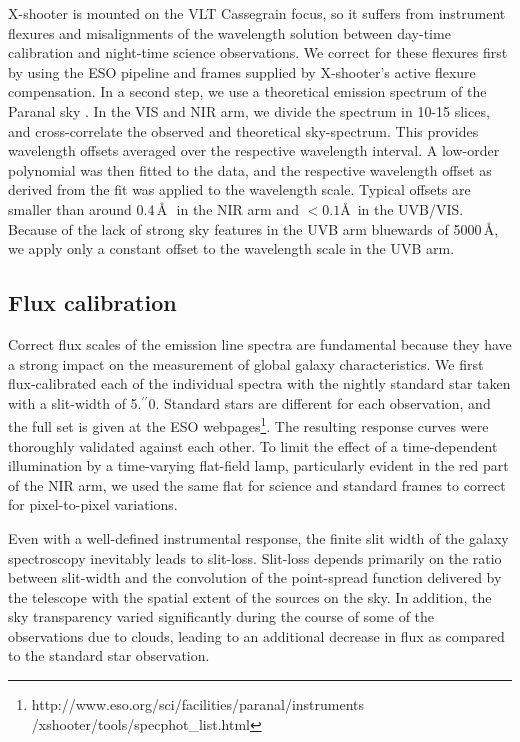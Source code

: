 \documentclass[traditabstract, longauth]{aa}
\newcommand{\farc}{\hbox{$.\!\!^{\prime\prime}$}}
\begin{document}
X-shooter is mounted on the VLT Cassegrain focus, so it suffers from instrument flexures and misalignments of the wavelength solution between day-time calibration and night-time science observations. We correct for these flexures first by using the ESO pipeline and frames supplied by X-shooter's active flexure compensation. In a second step, we use a theoretical emission spectrum of the Paranal sky \citep{2012A&A...543A..92N}. In the VIS and NIR arm, we divide the spectrum in 10-15 slices, and cross-correlate the observed and theoretical sky-spectrum. This provides wavelength offsets averaged over the respective wavelength interval. A low-order polynomial was then fitted to the data, and the respective wavelength offset as derived from the fit was applied to the wavelength scale. Typical offsets are smaller than around 0.4\,\AA\,\ in the NIR arm and $<0.1$\AA\, in the UVB/VIS. Because of the lack of strong sky features in the UVB arm bluewards of 5000\,\AA, we apply only a constant offset to the wavelength scale in the UVB arm.

\subsection{Flux calibration}
\label{FluxCal}

Correct flux scales of the emission line spectra are fundamental because they have a strong impact on the measurement of global galaxy characteristics. We first flux-calibrated each of the individual spectra with the nightly standard star taken with a slit-width of 5\farc{0}. Standard stars are different for each observation, and the full set is given at the ESO webpages\footnote{http://www.eso.org/sci/facilities/paranal/instruments\\/xshooter/tools/specphot\_list.html}. The resulting response curves were thoroughly validated against each other. To limit the effect of a time-dependent illumination by a time-varying flat-field lamp, particularly evident in the red part of the NIR arm, we used the same flat for science and standard frames to correct for pixel-to-pixel variations.

Even with a well-defined instrumental response, the finite slit width of the galaxy spectroscopy inevitably leads to slit-loss. Slit-loss depends primarily on the ratio between slit-width and the convolution of the point-spread function delivered by the telescope with the spatial extent of the sources on the sky. In addition, the sky transparency varied significantly during the course of some of the observations due to clouds, leading to an additional decrease in flux as compared to the standard star observation.
\end{document}
